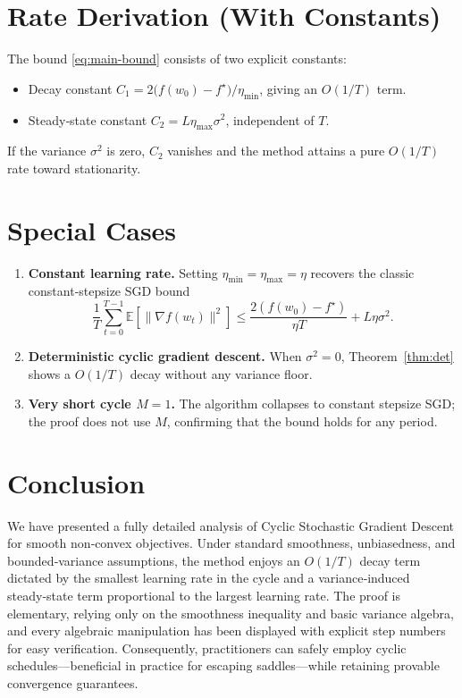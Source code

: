 \documentclass[11pt]{article}
\begin{document}
\section*{Rate Derivation (With Constants)}
The bound \eqref{eq:main-bound} consists of two explicit constants:

\begin{itemize}[noitemsep]
\item Decay constant $C_1=2\big(f(w_0)-f^\star\big)/\eta_{\min}$, giving an $O(1/T)$ term.
\item Steady‑state constant $C_2=L\eta_{\max}\sigma^2$, independent of $T$.
\end{itemize}
If the variance $\sigma^2$ is zero, $C_2$ vanishes and the method attains a pure $O(1/T)$ rate toward stationarity.

\section*{Special Cases}
\begin{enumerate}[label=(\alph*)]
\item \textbf{Constant learning rate.}  Setting $\eta_{\min}=\eta_{\max}=\eta$ recovers the classic constant‑stepsize SGD bound
\[
\frac{1}{T}\sum_{t=0}^{T-1}\mathbb{E}[\|\nabla f(w_t)\|^2]
\le \frac{2(f(w_0)-f^\star)}{\eta T}+L\eta\sigma^2 .
\]

\item \textbf{Deterministic cyclic gradient descent.}  When $\sigma^2=0$, Theorem~\ref{thm:det} shows a $O(1/T)$ decay without any variance floor.

\item \textbf{Very short cycle $M=1$.}  The algorithm collapses to constant stepsize SGD; the proof does not use $M$, confirming that the bound holds for any period.

\end{enumerate}

\section*{Conclusion}
We have presented a fully detailed analysis of Cyclic Stochastic Gradient Descent for smooth non‑convex objectives.  Under standard smoothness, unbiasedness, and bounded‑variance assumptions, the method enjoys an $O(1/T)$ decay term dictated by the smallest learning rate in the cycle and a variance‑induced steady‑state term proportional to the largest learning rate.  The proof is elementary, relying only on the smoothness inequality and basic variance algebra, and every algebraic manipulation has been displayed with explicit step numbers for easy verification.  Consequently, practitioners can safely employ cyclic schedules—beneficial in practice for escaping saddles—while retaining provable convergence guarantees.
\end{document}
